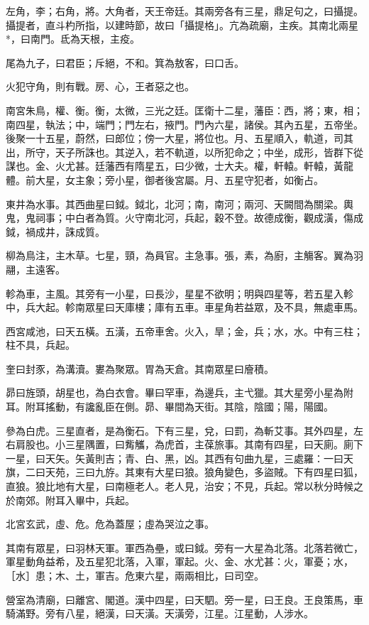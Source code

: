 \documentclass[10pt,fontset=adobe,UTF8,twoside]{ctexrep}
\begin{document}
左角，李；右角，將。大角者，天王帝廷。其兩旁各有三星，鼎足句之，曰攝提。攝提者，直斗杓所指，以建時節，故曰「攝提格」。亢為疏廟，主疾。其南北兩星*，曰南門。氐為天根，主疫。

尾為九子，曰君臣；斥絕，不和。箕為敖客，曰口舌。

火犯守角，則有戰。房、心，王者惡之也。

南宮朱鳥，權、衡。衡，太微，三光之廷。匡衛十二星，藩臣：西，將；東，相；南四星，執法；中，端門；門左右，掖門。門內六星，諸侯。其內五星，五帝坐。後聚一十五星，蔚然，曰郎位；傍一大星，將位也。月、五星順入，軌道，司其出，所守，天子所誅也。其逆入，若不軌道，以所犯命之；中坐，成形，皆群下從謀也。金、火尤甚。廷藩西有隋星五，曰少微，士大夫。權，軒轅。軒轅，黃龍體。前大星，女主象；旁小星，御者後宮屬。月、五星守犯者，如衡占。

東井為水事。其西曲星曰鉞。鉞北，北河；南，南河；兩河、天闕間為關梁。輿鬼，鬼祠事；中白者為質。火守南北河，兵起，穀不登。故德成衡，觀成潢，傷成鉞，禍成井，誅成質。

柳為鳥注，主木草。七星，頸，為員官。主急事。張，素，為廚，主觴客。翼為羽翮，主遠客。

軫為車，主風。其旁有一小星，曰長沙，星星不欲明；明與四星等，若五星入軫中，兵大起。軫南眾星曰天庫樓；庫有五車。車星角若益眾，及不具，無處車馬。

西宮咸池，曰天五橫。五潢，五帝車舍。火入，旱；金，兵；水，水。中有三柱；柱不具，兵起。

奎曰封豕，為溝瀆。婁為聚眾。胃為天倉。其南眾星曰廥積。

昴曰旌頭，胡星也，為白衣會。畢曰罕車，為邊兵，主弋獵。其大星旁小星為附耳。附耳搖動，有讒亂臣在側。昴、畢間為天街。其陰，陰國；陽，陽國。

參為白虎。三星直者，是為衡石。下有三星，兌，曰罰，為斬艾事。其外四星，左右肩股也。小三星隅置，曰觜觿，為虎首，主葆旅事。其南有四星，曰天廁。廁下一星，曰天矢。矢黃則吉；青、白、黑，凶。其西有句曲九星，三處羅：一曰天旗，二曰天苑，三曰九斿。其東有大星曰狼。狼角變色，多盜賊。下有四星曰狐，直狼。狼比地有大星，曰南極老人。老人見，治安；不見，兵起。常以秋分時候之於南郊。附耳入畢中，兵起。

北宮玄武，虛、危。危為蓋屋；虛為哭泣之事。

其南有眾星，曰羽林天軍。軍西為壘，或曰鉞。旁有一大星為北落。北落若微亡，軍星動角益希，及五星犯北落，入軍，軍起。火、金、水尤甚：火，軍憂；水，［水］患；木、土，軍吉。危東六星，兩兩相比，曰司空。

營室為清廟，曰離宮、閣道。漢中四星，曰天駟。旁一星，曰王良。王良策馬，車騎滿野。旁有八星，絕漢，曰天潢。天潢旁，江星。江星動，人涉水。
\end{document}
